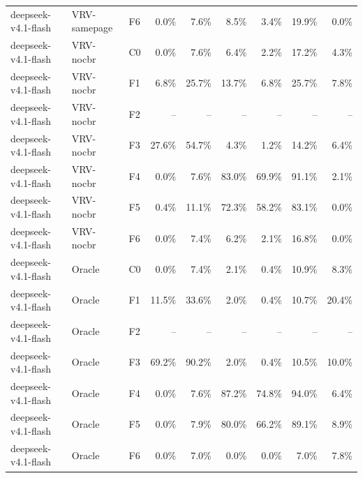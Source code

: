 \begin{tabular}{lllrrrrrr}
deepseek-v4.1-flash & VRV-samepage & F6 & 0.0\% & 7.6\% & 8.5\% & 3.4\% & 19.9\% & 0.0\% \\
deepseek-v4.1-flash & VRV-nocbr & C0 & 0.0\% & 7.6\% & 6.4\% & 2.2\% & 17.2\% & 4.3\% \\
deepseek-v4.1-flash & VRV-nocbr & F1 & 6.8\% & 25.7\% & 13.7\% & 6.8\% & 25.7\% & 7.8\% \\
deepseek-v4.1-flash & VRV-nocbr & F2 & -- & -- & -- & -- & -- & -- \\
deepseek-v4.1-flash & VRV-nocbr & F3 & 27.6\% & 54.7\% & 4.3\% & 1.2\% & 14.2\% & 6.4\% \\
deepseek-v4.1-flash & VRV-nocbr & F4 & 0.0\% & 7.6\% & 83.0\% & 69.9\% & 91.1\% & 2.1\% \\
deepseek-v4.1-flash & VRV-nocbr & F5 & 0.4\% & 11.1\% & 72.3\% & 58.2\% & 83.1\% & 0.0\% \\
deepseek-v4.1-flash & VRV-nocbr & F6 & 0.0\% & 7.4\% & 6.2\% & 2.1\% & 16.8\% & 0.0\% \\
deepseek-v4.1-flash & Oracle & C0 & 0.0\% & 7.4\% & 2.1\% & 0.4\% & 10.9\% & 8.3\% \\
deepseek-v4.1-flash & Oracle & F1 & 11.5\% & 33.6\% & 2.0\% & 0.4\% & 10.7\% & 20.4\% \\
deepseek-v4.1-flash & Oracle & F2 & -- & -- & -- & -- & -- & -- \\
deepseek-v4.1-flash & Oracle & F3 & 69.2\% & 90.2\% & 2.0\% & 0.4\% & 10.5\% & 10.0\% \\
deepseek-v4.1-flash & Oracle & F4 & 0.0\% & 7.6\% & 87.2\% & 74.8\% & 94.0\% & 6.4\% \\
deepseek-v4.1-flash & Oracle & F5 & 0.0\% & 7.9\% & 80.0\% & 66.2\% & 89.1\% & 8.9\% \\
deepseek-v4.1-flash & Oracle & F6 & 0.0\% & 7.0\% & 0.0\% & 0.0\% & 7.0\% & 7.8\% \\
\bottomrule
\end{tabular}


